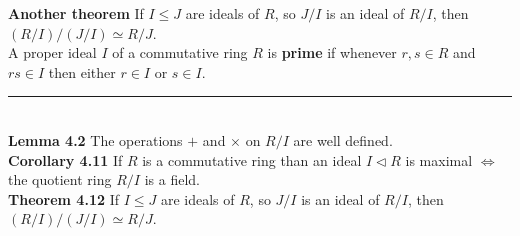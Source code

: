 \documentclass[a4paper]{article}
\begin{document}
\begin{framed}
	\noindent
	\textbf{Another theorem} If $I \leq J$ are ideals of $R$, so $J/I$ is an ideal of $R/I$, then $(R/I)/(J/I) \simeq R/J$.\\
	
	\noindent
	A proper ideal $I$ of a commutative ring $R$ is \textbf{prime} if whenever $r, s \in R$ and $rs \in I$ then either $r \in I$ or $s \in I$.
	
	\noindent\rule{\textwidth}{0.5pt}\\
	
	\noindent
	\textbf{Lemma 4.2} The operations $+$ and $\times$ on $R/I$ are well defined.\\
	
	\noindent
	\textbf{Corollary 4.11} If $R$ is a commutative ring than an ideal $I \triangleleft R$ is maximal $\iff$ the quotient ring $R/I$ is a field.\\
	
	\noindent
	\textbf{Theorem 4.12} If $I \leq J$ are ideals of $R$, so $J/I$ is an ideal of $R/I$, then $(R/I)/(J/I) \simeq R/J$.
\end{framed}
\end{document}
